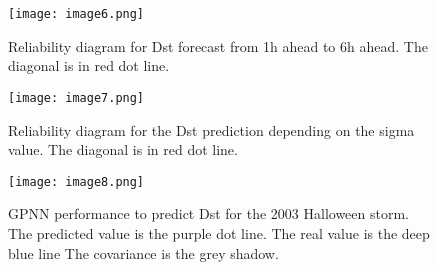 \begin{figure}
	\texttt{[image: image6.png]}
	\caption{Reliability diagram for Dst forecast from 1h ahead to 6h ahead. The diagonal is in red dot line.}
	\label{fig:gpnnreliability}
\end{figure}






\begin{figure}
	\texttt{[image: image7.png]}
	\caption{Reliability diagram for the Dst prediction depending on the sigma value. The diagonal is in red dot line.}
	\label{fig:gpnnreliabilitysigma}	
\end{figure}




\begin{figure}
	\texttt{[image: image8.png]}
	\caption{GPNN performance to predict Dst for the 2003 Halloween storm. The predicted value is the purple dot line. The real value is the deep blue line The covariance is the grey shadow.}
    \label{fig:gpnnhalloween}
\end{figure}







